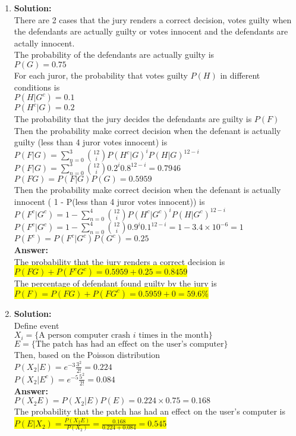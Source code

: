 \documentclass{article}
\newcommand{\myansw}{\textbf{Answer:}\\}
\newcommand{\mysolu}{\textbf{Solution:}\\}
\begin{document}
\begin{enumerate}
\begin{enumerate}
	\end{enumerate}
	\item
	\mysolu
	There are 2 cases that the jury renders a correct decision, votes guilty when the defendants are actually guilty or votes innocent and the defendants are actally innocent.\\
	The probability of the defendants are actually guilty is\\
	${P(G) = 0.75}$\\
	For each juror, the probability that votes guilty ${P(H)}$ in different conditions is\\
	${P(H|G^c) = 0.1}$\\
	${P(H^c|G) = 0.2}$\\
	The probability that the jury decides the defendants are guilty is ${P(F)}$\\ 
	Then the probability make correct decision when the defenant is actually guilty (less than 4 juror votes innocent) is\\
	${P(F|G) = \sum\limits_{n = 0}^3 {12 \choose i} P(H^c|G)^i P(H|G)^{12-i}}$\\
	${P(F|G) = \sum\limits_{n = 0}^3 {12 \choose i} 0.2^i 0.8^{12-i}= 0.7946}$\\
	${P(FG) = P(F|G)P(G) = 0.5959}$\\
	Then the probability make correct decision when the defenant is actually innocent ( 1 - P(less than 4 juror votes innocent)) is\\
	${P(F^c|G^c) = 1 - \sum\limits_{n = 0}^4 {12 \choose i} P(H^c|G^c)^i P(H|G^c)^{12-i}}$\\
	${P(F^c|G^c) =1 -  \sum\limits_{n = 0}^4 {12 \choose i} 0.9^i 0.1^{12-i}= 1 - 3.4 \times 10^{-6}=1}$\\
	${P(F^c) = P(F^c|G^c)P(G^c) = 0.25}$\\
	\myansw
	The probability that the jury renders a correct decision is\\
	\colorbox{yellow}{${P(FG)+P(F^cG^c) = 0.5959 + 0.25 = 0.8459}$}\\
	The percentage of defendant found guilty by the jury is\\
	\colorbox{yellow}{${P(F) = P(FG)+P(FG^c) = 0.5959 + 0 = 59.6\%}$}\\
	
	\item
	\mysolu
	Define event\\
	${X_i = \{\text{A person computer crash }i\text{ times in the month}\}}$\\
	${E = \{\text{The patch has had an effect on the user's computer}\}}$\\
	Then, based on the Poisson distribution\\
	${P(X_2|E) = e^{-3}\frac{3^2}{2!}=0.224}$\\
	${P(X_2|E^c) = e^{-5}\frac{5^2}{2!}=0.084}$\\
	\myansw
	${P(X_2E) = P(X_2|E)P(E) = 0.224 \times 0.75 = 0.168}$\\
	The probability that the patch has had an effect on the user's computer is\\
	\colorbox{yellow}{${P(E|X_2) = \frac{P(X_2E)}{P(X_2)}=\frac{0.168}{0.224+0.084}=0.545}$}\\	
	

\end{enumerate}
\end{document}
